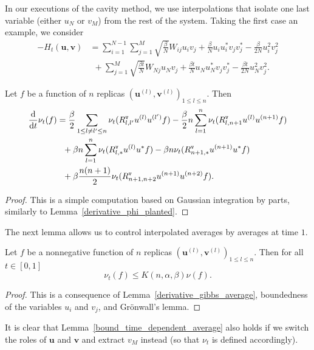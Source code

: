 \documentclass[final,12pt]{colt2018} %
\newcommand{\vtt}{\textup{\texttt{v}}}
\renewcommand{\u}{\bm{u}}
\renewcommand{\v}{\bm{v}}
\begin{document}
In our executions of the cavity method, we use interpolations that isolate one last  variable (either $u_N$ or $v_M$) from the rest of the system. Taking the first case an example, we consider 
\begin{align*}\label{interpolation_u}
-H_t(\u,\v) &=  \sum_{i=1}^{N-1} \sum_{j=1}^{M} \sqrt{\frac{\beta}{N}}W_{ij}u_i v_j + \frac{\beta}{N}u_iu_i^*v_jv_j^*- \frac{\beta}{2N}u_i^2v_j^2 \\
&~~+  \sum_{j=1}^M \sqrt{\frac{\beta t}{N}}W_{Nj}u_N v_j + \frac{\beta t}{N}u_Nu_N^*v_jv_j^* - \frac{\beta t}{2N}u_N^2v_j^2. \nonumber
\end{align*}  
\begin{lemma}\label{derivative_gibbs_average}
Let $f$ be a function of $n$ replicas $(\u^{(l)},\v^{(l)})_{1\le l \le n}$. Then 
\begin{align*}
\frac{\rmd}{\rmd t}\nu_t(f) &= \frac{\beta}{2} \sum_{1\le l\neq l' \le n} \nu_t(R^{\vtt}_{l,l'}u^{(l)}u^{(l')}f) 
- \frac{\beta}{2} n \sum_{l=1}^n \nu_t(R^{\vtt}_{l,n+1} u^{(l)}u^{(n+1)}f) \\
&~~+ \beta n \sum_{l=1}^n \nu_t(R^{\vtt}_{l,*} u^{(l)}u^{*}f) 
- \beta n  \nu_t(R^{\vtt}_{n+1,*} u^{(n+1)}u^{*}f) \\
&~~+  \beta \frac{n(n+1)}{2} \nu_t(R^{\vtt}_{n+1,n+2} u^{(n+1)}u^{(n+2)}f).
\end{align*}
\end{lemma}
\begin{proof}
This is a simple computation based on Gaussian integration by parts, similarly to Lemma~\ref{derivative_phi_planted}. 
\end{proof}
The next lemma allows us to control interpolated averages by averages at time $1$. 
\begin{lemma}\label{bound_time_dependent_average}
Let $f$ be a nonnegative function of $n$ replicas $(\u^{(l)},\v^{(l)})_{1\le l \le n}$. Then for all $t \in [0,1]$
\[\nu_t(f) \le K(n,\alpha,\beta) \nu(f).\]
\end{lemma}
\begin{proof}
This is a consequence of Lemma~\ref{derivative_gibbs_average}, boundedness of the variables $u_i$ and $v_j$, and Gr\"onwall's lemma. 
\end{proof}
It is clear that Lemma~\ref{bound_time_dependent_average} also holds if we switch the roles of $\u$ and $\v$ and extract $v_M$ instead (so that $\nu_t$ is defined accordingly).  
\end{document}
